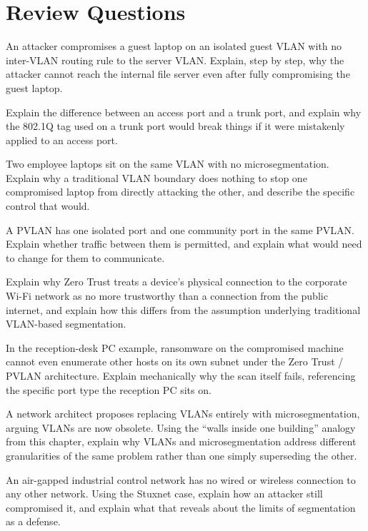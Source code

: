 \section*{Review Questions}
\begin{reviewquestions}
\item An attacker compromises a guest laptop on an isolated guest VLAN with no inter-VLAN routing
rule to the server VLAN. Explain, step by step, why the attacker cannot reach the internal file
server even after fully compromising the guest laptop.
\item Explain the difference between an access port and a trunk port, and explain why the 802.1Q
tag used on a trunk port would break things if it were mistakenly applied to an access port.
\item Two employee laptops sit on the same VLAN with no microsegmentation. Explain why a
traditional VLAN boundary does nothing to stop one compromised laptop from directly attacking the
other, and describe the specific control that would.
\item A PVLAN has one isolated port and one community port in the same PVLAN. Explain whether
traffic between them is permitted, and explain what would need to change for them to communicate.
\item Explain why Zero Trust treats a device's physical connection to the corporate Wi-Fi network
as no more trustworthy than a connection from the public internet, and explain how this differs
from the assumption underlying traditional VLAN-based segmentation.
\item In the reception-desk PC example, ransomware on the compromised machine cannot even
enumerate other hosts on its own subnet under the Zero Trust / PVLAN architecture. Explain
mechanically why the scan itself fails, referencing the specific port type the reception PC sits
on.
\item A network architect proposes replacing VLANs entirely with microsegmentation, arguing VLANs
are now obsolete. Using the ``walls inside one building'' analogy from this chapter, explain why
VLANs and microsegmentation address different granularities of the same problem rather than one
simply superseding the other.
\item An air-gapped industrial control network has no wired or wireless connection to any other
network. Using the Stuxnet case, explain how an attacker still compromised it, and explain what
that reveals about the limits of segmentation as a defense.
\end{reviewquestions}


